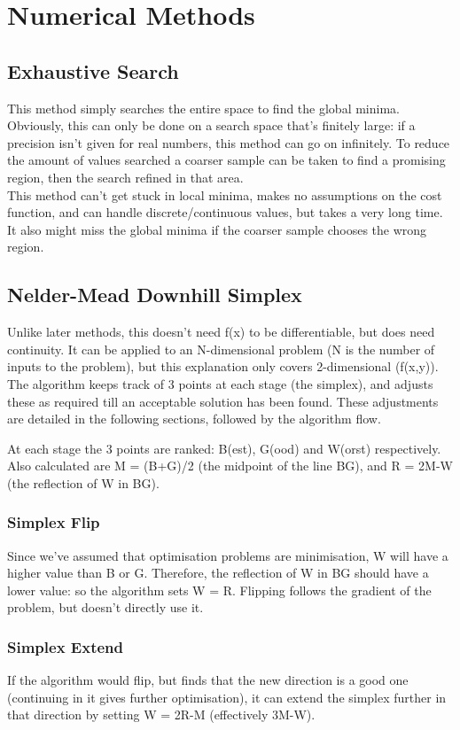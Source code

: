 \section{Numerical Methods}

\subsection{Exhaustive Search}
This method simply searches the entire space to find the global minima. Obviously, this can only be done on a search space that's finitely large: if a precision isn't given for real numbers, this method can go on infinitely. To reduce the amount of values searched a coarser sample can be taken to find a promising region, then the search refined in that area.\\

This method can't get stuck in local minima, makes no assumptions on the cost function, and can handle discrete/continuous values, but takes a very long time. It also might miss the global minima if the coarser sample chooses the wrong region.

\subsection{Nelder-Mead Downhill Simplex}
Unlike later methods, this doesn't need f(x) to be differentiable, but does need continuity. It can be applied to an N-dimensional problem (N is the number of inputs to the problem), but this explanation only covers 2-dimensional (f(x,y)). The algorithm keeps track of 3 points at each stage (the simplex), and adjusts these as required till an acceptable solution has been found. These adjustments are detailed in the following sections, followed by the algorithm flow.

At each stage the 3 points are ranked: B(est), G(ood) and W(orst) respectively. Also calculated are M = (B+G)/2 (the midpoint of the line BG), and R = 2M-W (the reflection of W in BG). 

\subsubsection{Simplex Flip}
Since we've assumed that optimisation problems are minimisation, W will have a higher value than B or G. Therefore, the reflection of W in BG should have a lower value: so the algorithm sets W = R. Flipping follows the gradient of the problem, but doesn't directly use it.

\subsubsection{Simplex Extend}
If the algorithm would flip, but finds that the new direction is a good one (continuing in it gives further optimisation), it can extend the simplex further in that direction by setting W = 2R-M (effectively 3M-W).


